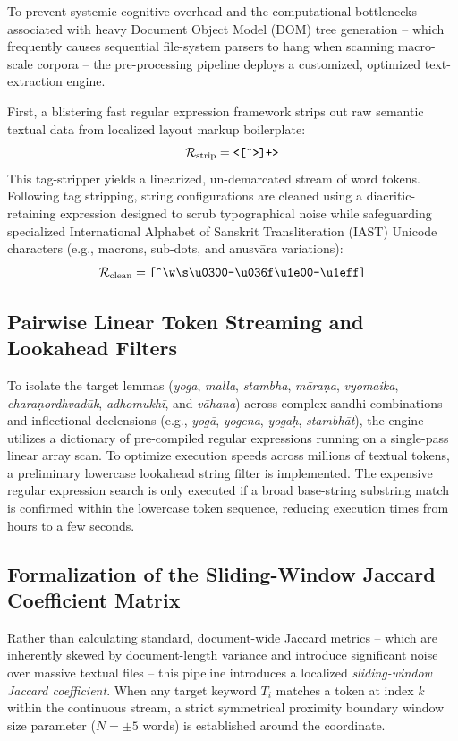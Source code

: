 \documentclass[11pt,twoside,letterpaper]{article}
\begin{document}
To prevent systemic cognitive overhead and the computational bottlenecks associated with heavy Document Object Model (DOM) tree generation -- which frequently causes sequential file-system parsers to hang when scanning macro-scale corpora -- the pre-processing pipeline deploys a customized, optimized text-extraction engine. 

First, a blistering fast regular expression framework strips out raw semantic textual data from localized layout markup boilerplate:
\begin{equation}
\mathcal{R}_{\text{strip}} = \text{\texttt{<[\^{}>]+>}}
\end{equation}
This tag-stripper yields a linearized, un-demarcated stream of word tokens. Following tag stripping, string configurations are cleaned using a diacritic-retaining expression designed to scrub typographical noise while safeguarding specialized International Alphabet of Sanskrit Transliteration (IAST) Unicode characters (e.g., macrons, sub-dots, and anusvāra variations):
\begin{equation}
\mathcal{R}_{\text{clean}} = \text{\texttt{[\^{}\textbackslash w\textbackslash s\textbackslash u0300-\textbackslash u036f\textbackslash u1e00-\textbackslash u1eff]}}
\end{equation}

\subsection{Pairwise Linear Token Streaming and Lookahead Filters}
To isolate the target lemmas (\textit{yoga}, \textit{malla}, \textit{stambha}, \textit{māraṇa}, \textit{vyomaika}, \textit{charaṇordhvadūk}, \textit{adhomukhī}, and \textit{vāhana}) across complex sandhi combinations and inflectional declensions (e.g., \textit{yogā}, \textit{yogena}, \textit{yogaḥ}, \textit{stambhāt}), the engine utilizes a dictionary of pre-compiled regular expressions running on a single-pass linear array scan. To optimize execution speeds across millions of textual tokens, a preliminary lowercase lookahead string filter is implemented. The expensive regular expression search is only executed if a broad base-string substring match is confirmed within the lowercase token sequence, reducing execution times from hours to a few seconds.

\subsection{Formalization of the Sliding-Window Jaccard Coefficient Matrix}
Rather than calculating standard, document-wide Jaccard metrics -- which are inherently skewed by document-length variance and introduce significant noise over massive textual files -- this pipeline introduces a localized \textit{sliding-window Jaccard coefficient}. When any target keyword $T_i$ matches a token at index $k$ within the continuous stream, a strict symmetrical proximity boundary window size parameter ($N = \pm 5$ words) is established around the coordinate. 
\end{document}
